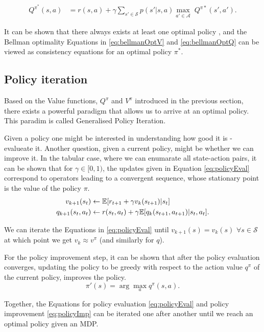 \documentclass{report}
\numberwithin{equation}{section}
\numberwithin{figure}{section}
\numberwithin{table}{section}
\numberwithin{algorithm}{section}
\begin{document}
\begin{align}\label{eq:bellmanOptQ}
  Q^{\pi^*}(s,a)&=r(s,a) + \gamma \sum_{s'\in \mathcal{S}}p(s'|s, a)\max_{a'\in \mathcal{A}}\;Q^{\pi*}(s', a').
\end{align}

It can be shown that there always exists at least one optimal 
policy \citep{Sutton1998}, and the Bellman optimality Equations 
in \ref{eq:bellmanOptV} and \ref{eq:bellmanOptQ} can be viewed 
as consistency equations for an optimal policy $\pi^*$.

\subsection{Policy iteration}
Based on the Value functions, $Q^{\pi}$ and $V^{\pi}$ introduced in the 
previous section, there exists a powerful paradigm that allows 
us to arrive at an optimal policy. This paradim is called Generalised 
Policy Iteration.

Given a policy one might be interested in understanding how good 
it is - evalueate it. Another question, given a current policy, 
might be whether we can improve it. In the tabular case, where 
we can enumarate all state-action pairs, it can be shown that 
for $\gamma\in[0, 1)$, the updates given in Equation 
\ref{eq:policyEval} correspond to operators 
leading to a convergent sequence, whose stationary point is the 
value of the policy $\pi$.
\begin{align}\label{eq:policyEval}
  v_{k+1}(s_t) &\gets \mathbb{E}[r_{t+1} + \gamma v_k(s_{t+1})|s_t]\notag\\
  q_{k+1}(s_t, a_t)&\gets r(s_t, a_t) 
  + \gamma\mathbb{E}[q_{k}(s_{t+1}, a_{t+1})|s_t,a_t].
\end{align}

We can iterate the Equations in \ref{eq:policyEval} until $v_{k+1}(s)=v_k(s)$ 
$\forall s\in \mathcal{S}$ at which point we get $v_k\approx v^{\pi}$ 
(and similarly for $q$).


For the policy improvement step, it can be shown \citep{Sutton1998} 
that after the 
policy evaluation converges, updating the policy 
to be greedy with respect to the action value $q^{\pi}$ of the 
current policy, improves the policy.
\begin{equation}\label{eq:policyImp}
  \pi'(s)=\arg \max_a q^{\pi}(s, a).
\end{equation}

Together, the Equations for policy evaluation \ref{eq:policyEval} 
and policy improvement \ref{eq:policyImp} 
can be iterated one after another until we reach an optimal policy 
given an MDP.
\end{document}
